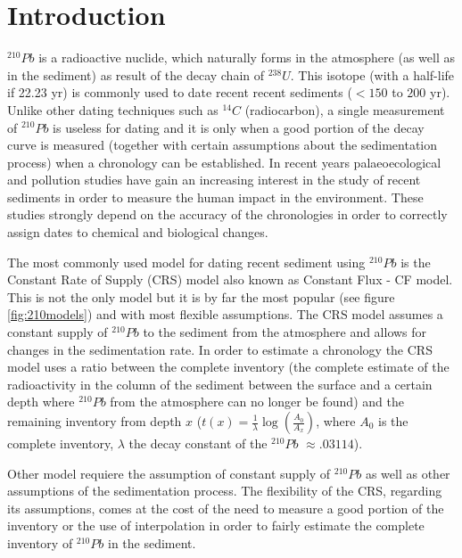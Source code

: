 \documentclass [10pt] {article}
\begin{document}
\section{Introduction}

$^{210}Pb$ is a radioactive nuclide, which naturally forms in the atmosphere (as well as in the sediment) as result of the decay chain of $^{238}U$. 
This isotope (with a half-life if 22.23 yr) is commonly used to date recent recent sediments ($<150$ to $200$ yr). 
Unlike other dating techniques such as $^{14}C$ (radiocarbon), a single measurement of $^{210}Pb$ is useless for dating and it is only when a good portion of the decay curve is measured (together with certain assumptions about the sedimentation process) when a chronology can be established.  
In recent years palaeoecological and pollution studies have gain an increasing interest in the study of recent sediments in order to measure the human impact in the environment.
These studies strongly depend on the accuracy of the chronologies in order to correctly assign dates to chemical and biological changes.

The most commonly used model for dating recent sediment using $^{210}Pb$ is the Constant Rate of Supply (CRS) model \citep{Appleby1978,Robbins1978,Sanchez-Cabeza2012} also known as Constant Flux - CF model. 
This is not the only model but it is by far the most popular (see figure \ref{fig:210models}) and with most flexible assumptions. 
The CRS model assumes a constant supply of $^{210}Pb$ to the sediment from the atmosphere and allows for changes in the sedimentation rate. 
In order to estimate a chronology the CRS model uses a ratio between the complete inventory (the complete estimate of the radioactivity in the column of the sediment between the surface and a certain depth where $^{210}Pb$ from the atmosphere can no longer be found) and the remaining  inventory from depth $x$ ($t(x)=\frac{1}{\lambda}\log\left( \frac{A_0}{A_x}\right)$, where $A_0$ is the complete inventory, $\lambda$ the decay constant of the $^{210}Pb$ $\approx .03114$).

Other model requiere the assumption of constant supply of $^{210}Pb$ as well as other assumptions of the sedimentation process. 
The flexibility of the CRS, regarding its assumptions, comes at the cost of the need to measure a good portion of the inventory or the use of interpolation in order to fairly estimate the complete inventory of $^{210}Pb$ in the sediment. 
\end{document}
